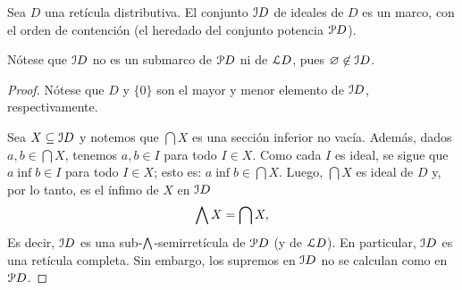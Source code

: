 \begin{lemma}
    Sea $D$ una retícula distributiva.
    El conjunto $\cal ID$ de ideales de $D$ es un marco,
    con el orden de contención (el heredado del conjunto potencia
    $\cal PD$).
    
    Nótese que $\cal ID$ no es un submarco de $\cal PD$
    ni de $\cal LD$, pues $\emptyset\nin\cal ID$.
\end{lemma}
\begin{proof}
    Nótese que $D$ y $\{0\}$ son el mayor y menor elemento
    de $\cal ID$, respectivamente.
    
    Sea $X\subseteq\cal ID$ y notemos que $\bigcap X$
    es una sección inferior no vacía.
    Además, dados $a,b\in \bigcap X$, tenemos
    $a,b\in I$ para todo $I\in X$.
    Como cada $I$ es ideal, se sigue que
    $a\inf b\in I$ para todo $I\in X$; esto es:
    $a\inf b\in\bigcap X$.
    Luego, $\bigcap X$ es ideal de $D$ y, por lo tanto,
    es el ínfimo de $X$ en $\cal ID$
    \[
        \Inf X = \bigcap X,
    \]
    Es decir, $\cal ID$ es una sub-$\Inf$-semirretícula
    de $\cal PD$ (y de $\cal LD$).
    En particular, $\cal ID$ es una retícula completa.
    Sin embargo, los supremos en $\cal ID$ no se calculan
    como en $\cal PD$.
    

\end{proof}
